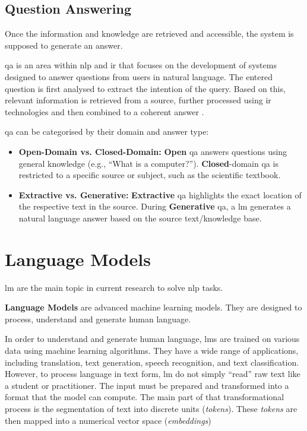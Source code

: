 \subsection{Question Answering}\label{subsec:question_answering_prel}
%
Once the information and knowledge are retrieved and accessible, the system is supposed to generate an answer.
\begin{definition}
\ac{qa} is an area within \ac{nlp} and \ac{ir} that focuses on the development of systems designed to answer questions from users in natural language. 
The entered question is first analysed to extract the intention of the query. 
Based on this, relevant information is retrieved from a source, further processed using \ac{ir} technologies and then combined to a coherent answer \citep{Manning2008}.
\end{definition}
%
\ac{qa} can be categorised by their domain and answer type:
\begin{itemize}
    \item \textbf{Open-Domain vs. Closed-Domain:} \textbf{Open} \ac{qa} answers questions using general knowledge (e.g., \enquote{What is a computer?}). 
    \textbf{Closed}-domain \ac{qa} is restricted to a specific source or subject, such as the \citet{bb2} scientific textbook.
    \item \textbf{Extractive vs. Generative:} \textbf{Extractive} \ac{qa} highlights the exact location of the respective text in the source.
    During \textbf{Generative} \ac{qa}, a \ac{lm} generates a natural language answer based on the source text/knowledge base.
\end{itemize}
%
\section{Language Models}\label{sec:lm}
\ac{lm} are the main topic in current research to solve \ac{nlp} tasks.
%
\begin{definition}\label{def:lm}
    \textbf{Language Models} are advanced machine learning models.
    They are designed to process, understand and generate human language.
\end{definition}
In order to understand and generate human language, \acp{lm} are trained on various data using machine learning algorithms. 
They have a wide range of applications, including translation, text generation, speech recognition, and text classification.
However, to process language in text form, \ac{lm} do not simply \enquote{read} raw text like a student or practitioner.
The input must be prepared and transformed into a format that the model can compute.
The main part of that transformational process is the segmentation of text into discrete units (\textit{tokens}).
These \textit{tokens} are then mapped into a numerical vector space (\textit{embeddings})
%
